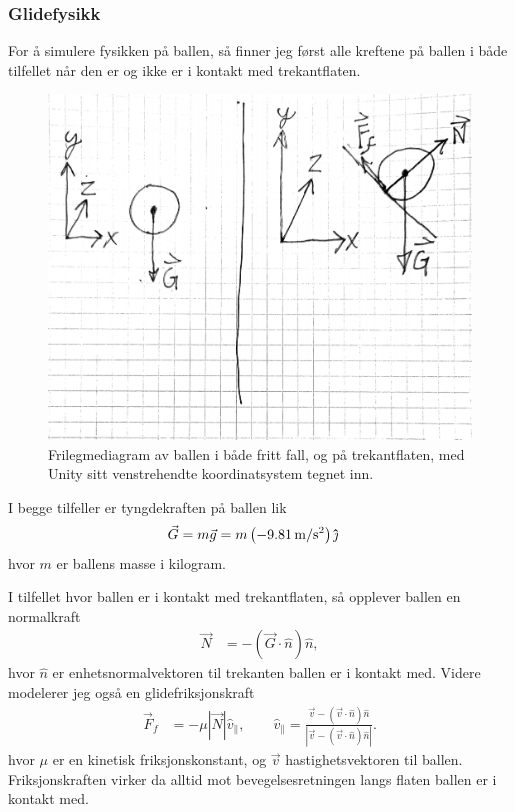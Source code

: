 \documentclass[norsk, doc, 11pt, a4paper]{apa7}  %
\newcommand{\uvecj}{{\bm{\hat{\textit{\j}}}}}
\begin{document}
\subsubsection{Glidefysikk}
For å simulere fysikken på ballen, så finner jeg først alle kreftene på ballen i både tilfellet når den er og ikke er i kontakt med trekantflaten.
\begin{figure}[H]
	\centering
	\label{fig:frilegmediagram}
	\includegraphics[scale=0.25]{figs/frilegmediagram.pdf}
	\caption{Frilegmediagram av ballen i både fritt fall, og på trekantflaten, med Unity sitt venstrehendte koordinatsystem tegnet inn.}
\end{figure}

I begge tilfeller er tyngdekraften på ballen lik
\begin{align*}
	\vec{G} &= m\vec{g} = m\left(\SI{-9.81}{\metre\per\second^{2}}\right)\uvecj
\end{align*}
hvor \(m\) er ballens masse i kilogram.

I tilfellet hvor ballen er i kontakt med trekantflaten, så opplever ballen en normalkraft
\begin{align*}
	\vec{N} &= -\left(\vec{G}\cdot\hat{n}\right)\hat{n},
\end{align*}
hvor \(\hat{n}\) er enhetsnormalvektoren til trekanten ballen er i kontakt med. Videre modelerer jeg også en glidefriksjonskraft
\begin{align*}
	\vec{F}_{f} &= -\mu |\vec{N}| \hat{v}_{\parallel}, \qquad
	\hat{v}_{\parallel} = \frac{\vec{v} - \left(\vec{v}\cdot\hat{n}\right)\hat{n}}{|\vec{v} - \left(\vec{v}\cdot\hat{n}\right)\hat{n}|}.
\end{align*}
hvor \(\mu\) er en kinetisk friksjonskonstant, og \(\vec{v}\) hastighetsvektoren til ballen. Friksjonskraften virker da alltid mot bevegelsesretningen langs flaten ballen er i kontakt med.
\end{document}
